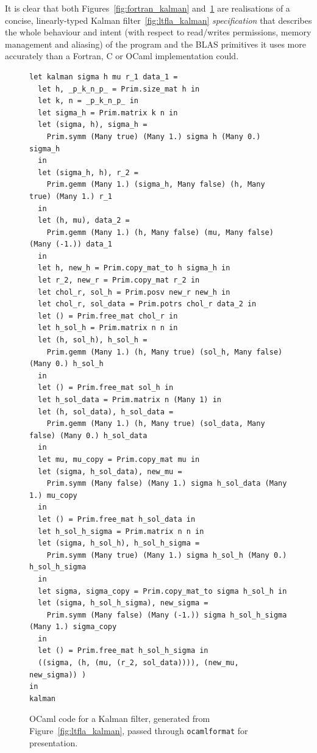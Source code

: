 It is clear that both Figures~\ref{fig:fortran_kalman}
and~\ref{fig:ocaml_kalman} are realisations of a concise, linearly-typed Kalman
filter~\ref{fig:ltfla_kalman} \emph{specification} that describes the whole
behaviour and intent (with respect to read/writes permissions, memory
management and aliasing) of the program and the BLAS primitives it uses more
accurately than a Fortran, C or OCaml implementation could.

\begin{figure}[p]
    \begin{verbatim}
let kalman sigma h mu r_1 data_1 =
  let h, _p_k_n_p_ = Prim.size_mat h in
  let k, n = _p_k_n_p_ in
  let sigma_h = Prim.matrix k n in
  let (sigma, h), sigma_h =
    Prim.symm (Many true) (Many 1.) sigma h (Many 0.) sigma_h
  in
  let (sigma_h, h), r_2 =
    Prim.gemm (Many 1.) (sigma_h, Many false) (h, Many true) (Many 1.) r_1
  in
  let (h, mu), data_2 =
    Prim.gemm (Many 1.) (h, Many false) (mu, Many false) (Many (-1.)) data_1
  in
  let h, new_h = Prim.copy_mat_to h sigma_h in
  let r_2, new_r = Prim.copy_mat r_2 in
  let chol_r, sol_h = Prim.posv new_r new_h in
  let chol_r, sol_data = Prim.potrs chol_r data_2 in
  let () = Prim.free_mat chol_r in
  let h_sol_h = Prim.matrix n n in
  let (h, sol_h), h_sol_h =
    Prim.gemm (Many 1.) (h, Many true) (sol_h, Many false) (Many 0.) h_sol_h
  in
  let () = Prim.free_mat sol_h in
  let h_sol_data = Prim.matrix n (Many 1) in
  let (h, sol_data), h_sol_data =
    Prim.gemm (Many 1.) (h, Many true) (sol_data, Many false) (Many 0.) h_sol_data
  in
  let mu, mu_copy = Prim.copy_mat mu in
  let (sigma, h_sol_data), new_mu =
    Prim.symm (Many false) (Many 1.) sigma h_sol_data (Many 1.) mu_copy
  in
  let () = Prim.free_mat h_sol_data in
  let h_sol_h_sigma = Prim.matrix n n in
  let (sigma, h_sol_h), h_sol_h_sigma =
    Prim.symm (Many true) (Many 1.) sigma h_sol_h (Many 0.) h_sol_h_sigma
  in
  let sigma, sigma_copy = Prim.copy_mat_to sigma h_sol_h in
  let (sigma, h_sol_h_sigma), new_sigma =
    Prim.symm (Many false) (Many (-1.)) sigma h_sol_h_sigma (Many 1.) sigma_copy
  in
  let () = Prim.free_mat h_sol_h_sigma in
  ((sigma, (h, (mu, (r_2, sol_data)))), (new_mu, new_sigma)) )
in
kalman
    \end{verbatim}
    \caption{OCaml code for a Kalman filter, generated from
        Figure~\ref{fig:ltfla_kalman}, passed through \texttt{ocamlformat} for
        presentation.}\label{fig:ocaml_kalman}

\end{figure}

